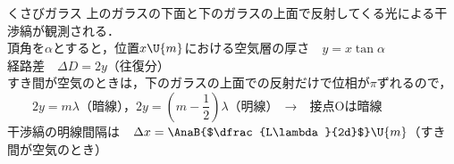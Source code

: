 \begin{matome}{くさびガラス}
\hspace{3mm}  上のガラスの下面と下のガラスの上面で反射してくる光による干渉縞が観測される．\\
\hspace{3mm}  頂角を$\alpha$とすると，位置$x\U{m}$における空気層の厚さ　$y=x\tan\alpha$\\
\hspace{3mm}  経路差　$\Delta D=2y$（往復分）\\
\hspace{3mm}  すき間が空気のときは，下のガラスの上面での反射だけで位相が$\pi$ずれるので，\\
\hspace{3mm} 　　$2y=m\lambda$（暗線），$2y=\left(m-\dfrac{1}{2}\right)\lambda$（明線）　→　{\gtfamily 接点$\mathrm{O}$は暗線}\\
\hspace{3mm}  干渉縞の明線間隔は　$\Delta x=\AnaB{$\dfrac{L\lambda}{2d}$}\U{m}$（すき間が空気のとき）
\end{matome}


